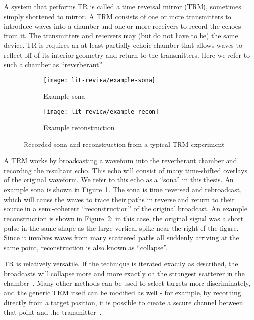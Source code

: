A system that performs TR is called a time reversal mirror (TRM), sometimes simply shortened to mirror. A TRM consists of one or more transmitters to introduce waves into a chamber and one or more receivers to record the echoes from it. The transmitters and receivers may (but do not have to be) the same device. TR is requires an at least partially echoic chamber that allows waves to reflect off of its interior geometry and return to the transmitters. Here we refer to such a chamber as ``reverberant''.

\begin{figure}[h!]
    \centering
    \begin{subfigure}{.45\textwidth}
        \centering
        \texttt{[image: lit-review/example-sona]}
        \caption[Example sona]{Example sona}
         \label{fig:lit-review-example-sona}
    \end{subfigure}
    \begin{subfigure}{.45\textwidth}
        \centering
        \texttt{[image: lit-review/example-recon]}
        \caption[Example reconstruction]{Example reconstruction}
         \label{fig:lit-review-example-recon}
    \end{subfigure}
    \caption{Recorded sona and reconstruction from a typical TRM experiment}
    \label{fig:lit-review-example}
\end{figure}

A TRM works by broadcasting a waveform into the reverberant chamber and recording the resultant echo. This echo will consist of many time-shifted overlays of the original waveform. We refer to this echo as a ``sona'' in this thesis. An example sona is shown in Figure~\ref{fig:lit-review-example-sona}. The sona is time reversed and rebroadcast, which will cause the waves to trace their paths in reverse and return to their source in a semi-coherent ``reconstruction'' of the original broadcast. An example reconstruction is shown in Figure~\ref{fig:lit-review-example-recon}: in this case, the original signal was a short pulse in the same shape as the large vertical spike near the right of the figure. Since it involves waves from many scattered paths all suddenly arriving at the same point, reconstruction is also known as ``collapse''.

TR is relatively versatile. If the technique is iterated exactly as described, the broadcasts will collapse more and more exactly on the strongest scatterer in the chamber~\cite{fink_time-reversed_1999}. Many other methods can be used to select targets more discriminately, and the generic TRM itself can be modified as well - for example, by recording directly from a target position, it is possible to create a secure channel between that point and the transmitter~\cite{nltr-wave-chaotic}.

